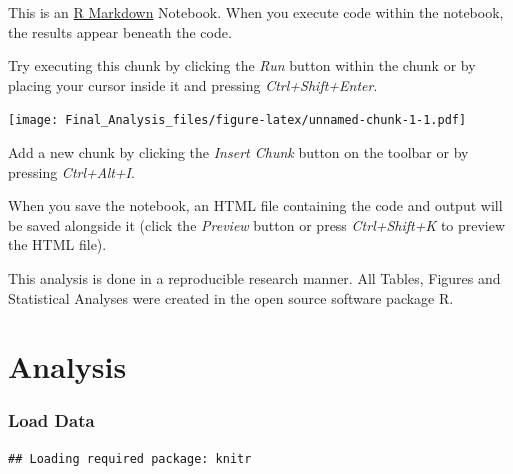 This is an \href{http://rmarkdown.rstudio.com}{R Markdown} Notebook.
When you execute code within the notebook, the results appear beneath
the code.

Try executing this chunk by clicking the \emph{Run} button within the
chunk or by placing your cursor inside it and pressing
\emph{Ctrl+Shift+Enter}.

\begin{Shaded}
\begin{Highlighting}[]
\end{Highlighting}
\end{Shaded}

\texttt{[image: Final\_Analysis\_files/figure-latex/unnamed-chunk-1-1.pdf]}

Add a new chunk by clicking the \emph{Insert Chunk} button on the
toolbar or by pressing \emph{Ctrl+Alt+I}.

When you save the notebook, an HTML file containing the code and output
will be saved alongside it (click the \emph{Preview} button or press
\emph{Ctrl+Shift+K} to preview the HTML file).

This analysis is done in a reproducible research manner. All Tables,
Figures and Statistical Analyses were created in the open source
software package R.

\section{Analysis}\label{analysis}

\subsubsection{Load Data}\label{load-data}

\begin{Shaded}
\begin{Highlighting}[]
\NormalTok{(} \NormalTok{, }\NormalTok{, }\NormalTok{, } \NormalTok{)}
\end{Highlighting}
\end{Shaded}

\begin{verbatim}
## Loading required package: knitr
\end{verbatim}

